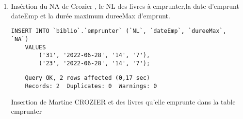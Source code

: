 \documentclass{article}
\begin{document}
\begin{enumerate}
	\item Insértion du  NA de Crozier , le NL des livres à emprunter,la date d'emprunt dateEmp et la durée maximum dureeMax d'emprunt.
	      \begin{listing}[H]
		      \begin{verbatim}
INSERT INTO `biblio`.`emprunter` (`NL`, `dateEmp`, `dureeMax`, `NA`) 
	VALUES 
		('31', '2022-06-28', '14', '7'),
		('23', '2022-06-28', '14', '7');
\end{verbatim}
		      \begin{verbatim}
	Query OK, 2 rows affected (0,17 sec)
	Records: 2  Duplicates: 0  Warnings: 0
\end{verbatim}
		      \caption{Insertion de Martine CROZIER et des livres qu'elle emprunte dans la table emprunter}
	      \end{listing}
\end{enumerate}
\end{document}
